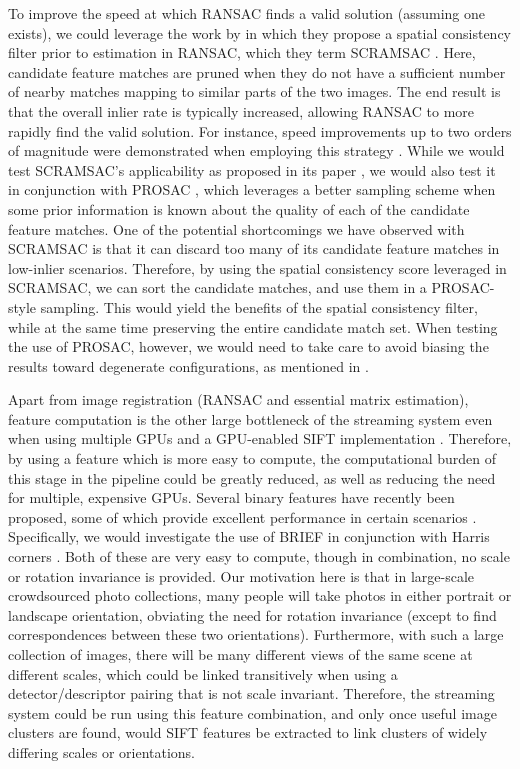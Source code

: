 To improve the speed at which RANSAC finds a valid solution (assuming one exists), we could leverage the work by \citet{sattler2009_scramsac} in which they propose a spatial consistency filter prior to estimation in RANSAC, which they term SCRAMSAC \cite{sattler2009_scramsac}.
Here, candidate feature matches are pruned when they do not have a sufficient number of nearby matches mapping to similar parts of the two images.
The end result is that the overall inlier rate is typically increased, allowing RANSAC to more rapidly find the valid solution.
For instance, speed improvements up to two orders of magnitude were demonstrated when employing this strategy \cite{sattler2009_scramsac}.
While we would test SCRAMSAC's applicability as proposed in its paper \cite{sattler2009_scramsac}, we would also test it in conjunction with PROSAC \cite{chum2005_prosac}, which leverages a better sampling scheme when some prior information is known about the quality of each of the candidate feature matches.
One of the potential shortcomings we have observed with SCRAMSAC is that it can discard too many of its candidate feature matches in low-inlier scenarios.
Therefore, by using the spatial consistency score leveraged in SCRAMSAC, we can sort the candidate matches, and use them in a PROSAC-style sampling.
This would yield the benefits of the spatial consistency filter, while at the same time preserving the entire candidate match set.
When testing the use of PROSAC, however, we would need to take care to avoid biasing the results toward degenerate configurations, as mentioned in \citet{sattler2009_scramsac}.

Apart from image registration (RANSAC and essential matrix estimation), feature computation is the other large bottleneck of the streaming system even when using multiple GPUs and a GPU-enabled SIFT implementation \cite{wu2007_siftgpu}.
Therefore, by using a feature which is more easy to compute, the computational burden of this stage in the pipeline could be greatly reduced, as well as reducing the need for multiple, expensive GPUs.
Several binary features have recently been proposed, some of which provide excellent performance in certain scenarios \cite{heinly2012_binary_descriptors}.
Specifically, we would investigate the use of BRIEF \cite{calonder2010_brief} in conjunction with Harris corners \cite{harris1988_corner}.
Both of these are very easy to compute, though in combination, no scale or rotation invariance is provided.
Our motivation here is that in large-scale crowdsourced photo collections, many people will take photos in either portrait or landscape orientation, obviating the need for rotation invariance (except to find correspondences between these two orientations).
Furthermore, with such a large collection of images, there will be many different views of the same scene at different scales, which could be linked transitively when using a detector/descriptor pairing that is not scale invariant.
Therefore, the streaming system could be run using this feature combination, and only once useful image clusters are found, would SIFT features \cite{lowe2004_sift, wu2007_siftgpu} be extracted to link clusters of widely differing scales or orientations.

